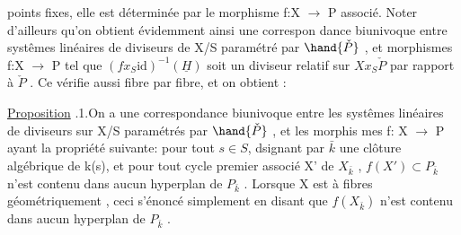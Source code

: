 
points fixes, elle est déterminée  par le morphisme f:X $\longrightarrow$ P
associé. Noter d'ailleurs qu'on obtient évidemment ainsi une correspon
dance biunivoque entre systêmes linéaires de diviseurs de X/S paramétré
par $\hand{\check{P}}$ , et morphismes f:X $\longrightarrow$ P tel que $(fx_S\mathrm{id})^{-1}(\underline{H})$ soit un
diviseur  relatif sur $Xx_S\check{P}$ par rapport à $\check{P}$ . Ce  
 vérifie aussi fibre par fibre, et on obtient :

\uline{Proposition} .1.On a une correspondance biunivoque entre les 
systêmes linéaires  de diviseurs sur X/S paramétrés par $\hand{\check{P}}$ , et les morphis
mes f: X $\longrightarrow$ P ayant la propriété suivante: pour tout $s\in S$, dsignant
par $\bar{k}$ une clôture algébrique de k(s), et pour tout cycle premier associé
X' de $X_{\bar{k}}$ , $f(X')\subset P_{\bar{k}}$ n'est contenu dans aucun hyperplan de $P_{\bar{k}}$ .
\hand{(}Lorsque X est à fibres géométriquement  , ceci 
 s'énoncé simplement en disant que $f(X_{\bar{k}})$ n'est contenu dans aucun
hyperplan de $P_{\bar{k}}$ \hand{)}.

